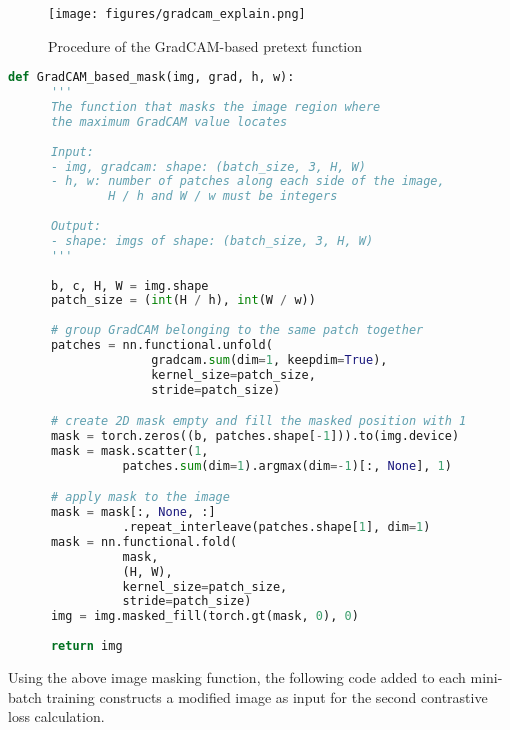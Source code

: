 \documentclass[12pt,twoside]{report}
\begin{document}
\begin{figure}
  \centering
  \texttt{[image: figures/gradcam\_explain.png]}
  \caption{Procedure of the GradCAM-based pretext function}
  \label{fig:grad_perturb_explain}
\end{figure}

\begin{lstlisting}[language=Python, caption=Gradient-based Masking function]
    def GradCAM_based_mask(img, grad, h, w):
      '''
      The function that masks the image region where 
      the maximum GradCAM value locates
    
      Input:
      - img, gradcam: shape: (batch_size, 3, H, W)
      - h, w: number of patches along each side of the image, 
              H / h and W / w must be integers
    
      Output: 
      - shape: imgs of shape: (batch_size, 3, H, W)
      '''
    
      b, c, H, W = img.shape
      patch_size = (int(H / h), int(W / w))
      
      # group GradCAM belonging to the same patch together 
      patches = nn.functional.unfold(
                    gradcam.sum(dim=1, keepdim=True), 
                    kernel_size=patch_size, 
                    stride=patch_size)

      # create 2D mask empty and fill the masked position with 1
      mask = torch.zeros((b, patches.shape[-1])).to(img.device)
      mask = mask.scatter(1, 
                patches.sum(dim=1).argmax(dim=-1)[:, None], 1)

      # apply mask to the image
      mask = mask[:, None, :]
                .repeat_interleave(patches.shape[1], dim=1)
      mask = nn.functional.fold(
                mask, 
                (H, W), 
                kernel_size=patch_size, 
                stride=patch_size)
      img = img.masked_fill(torch.gt(mask, 0), 0)
      
      return img
\end{lstlisting} \label{fig:masking_code}

Using the above image masking function, the following code added to each mini-batch training constructs a modified image as input for the second contrastive loss calculation. 
\end{document}
